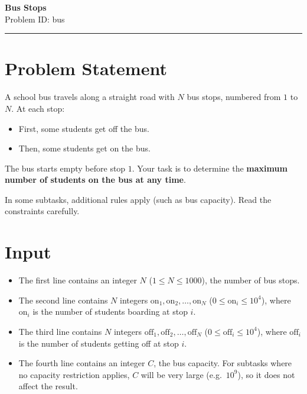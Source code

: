 \documentclass[12pt,a4paper]{article}
\begin{document}
\ifdefined\BOOKLET
  \pagestyle{empty}
\fi

\begin{center}
    {\LARGE \textbf{Bus Stops}} \\[0.5em]
    {Problem ID: bus} \\[1em]
    \rule{\textwidth}{0.4pt}
\end{center}

\vspace{1em}

\section*{Problem Statement}
A school bus travels along a straight road with $N$ bus stops, numbered from $1$ to $N$.  
At each stop:
\begin{itemize}
    \item First, some students get off the bus.  
    \item Then, some students get on the bus.  
\end{itemize}

The bus starts empty before stop $1$. Your task is to determine the \textbf{maximum number of students on the bus at any time}.

In some subtasks, additional rules apply (such as bus capacity). Read the constraints carefully.

\section*{Input}
\begin{itemize}
    \item The first line contains an integer $N$ ($1 \leq N \leq 1000$), the number of bus stops.  
    \item The second line contains $N$ integers $\text{on}_1, \text{on}_2, \ldots, \text{on}_N$ ($0 \leq \text{on}_i \leq 10^4$),  
    where $\text{on}_i$ is the number of students boarding at stop $i$.  
    \item The third line contains $N$ integers $\text{off}_1, \text{off}_2, \ldots, \text{off}_N$ ($0 \leq \text{off}_i \leq 10^4$),  
    where $\text{off}_i$ is the number of students getting off at stop $i$.  
    \item The fourth line contains an integer $C$, the bus capacity.  
    For subtasks where no capacity restriction applies, $C$ will be very large (e.g.\ $10^9$), so it does not affect the result.  
\end{itemize}
\end{document}
